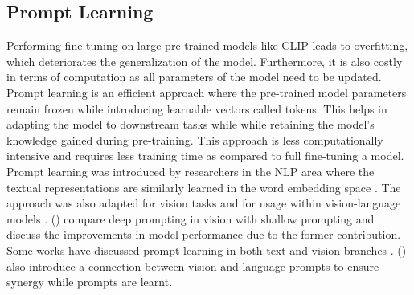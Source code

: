\documentclass[letterpaper]{article}
\begin{document}
\subsection{Prompt Learning}
Performing fine-tuning on large pre-trained models like CLIP \cite{vanilla_clip} leads to overfitting, which deteriorates the generalization of the model. Furthermore, it is also costly in terms of computation as all parameters of the model need to be updated. Prompt learning is an efficient approach where the pre-trained model parameters remain frozen while introducing learnable vectors called tokens. This helps in adapting the model to downstream tasks while while retaining the model's knowledge gained during pre-training. This approach is less computationally intensive  and requires less training time as compared to full fine-tuning a model. Prompt learning was introduced by researchers in the NLP area where the textual representations are similarly learned in the word embedding space \cite{nlp-prompt1,nlp-prompt2,nlp-prompt3,nlp-prompt4}. The approach was also adapted for vision tasks \cite{jia2022visual_16_deep,wang2022dualprompt_38,zhang2022neural_47} and for usage within vision-language models \cite{cocoop,coop,zhu2024promptaligned_51}.  \citeauthor{jia2022visual_16_deep} (\citeyear{jia2022visual_16_deep}) compare deep prompting in vision with shallow prompting and discuss the improvements in model performance due to the former contribution. Some works have discussed prompt learning in both text and vision branches \cite{maple,vifi,vita}. \citeauthor{maple} (\citeyear{maple}) also introduce a connection between vision and language prompts to ensure synergy while prompts are learnt.
\end{document}

